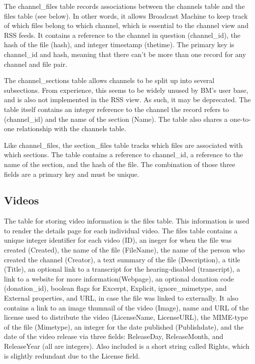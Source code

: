 \documentclass[a4paper,12pt]{report}
\begin{document}
The channel\_files table records associations between the channels table and the files table (see below). In other words, it allows Broadcast Machine to keep track of which files belong to which channel, which is essential to the channel view and RSS feeds. It contains a reference to the channel in question (channel\_id), the hash of the file (hash), and integer timestamp (thetime). The primary key is channel\_id and hash, meaning that there can't be more than one record for any channel and file pair.


The channel\_sections table allows channels to be split up into several subsections. From experience, this seems to be widely unused by BM's user base, and is also not implemented in the RSS view. As such, it may be deprecated. The table itself contains an integer reference to the channel the record refers to (channel\_id) and the name of the section (Name). The table also shares a one-to-one relationship with the channels table.


Like channel\_files, the section\_files table tracks which files are associated with which sections. The table contains a reference to channel\_id, a reference to the name of the section, and the hash of the file. The combination of those three fields are a primary key and must be unique.


\subsection{Videos}
The table for storing video information is the files table. This information is used to render the details page for each individual video. The files table contains a unique integer identifier for each video (ID), an ineger for when the file was created (Created), the name of the file (FileName), the name of the person who created the channel (Creator), a text summary of the file (Description), a title (Title), an optional link to a transcript for the hearing-disabled (transcript), a link to a website for more information(Webpage), an optional donation code (donation\_id), boolean flags for Excerpt, Explicit, ignore\_mimetype, and External properties, and URL, in case the file was linked to externally. It also contains a link to an image thumnail of the video (Image), name and URL of the license used to distribute the video (LicenseName, LicenseURL), the MIME-type of the file (Mimetype), an integer for the date published (Publishdate), and the date of the video release via three fields: ReleaseDay, ReleaseMonth, and ReleaseYear (all are integers). Also included is a short string called Rights, which is slightly redundant due to the License field. 
\end{document}
